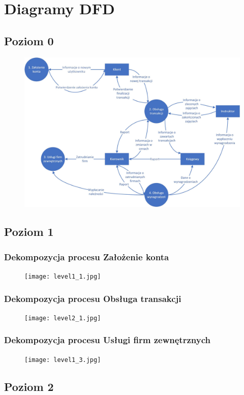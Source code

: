 \documentclass[a4paper,11pt]{article}
\begin{document}
\section{Diagramy DFD}
\subsection{Poziom 0}
    \begin{figure}[!htb]
    \centerline{\includegraphics[scale=0.9]{level0.jpg}}
    \label{fig:level0}
    \end{figure}
\newpage



\subsection{Poziom 1}
\subsubsection{Dekompozycja procesu Założenie konta}
    \begin{figure}[!htb]
    \centerline{\texttt{[image: level1\_1.jpg]}}
    \label{fig:level1_1}
    \end{figure}
    \newpage



\subsubsection{Dekompozycja procesu Obsługa transakcji}
    \begin{figure}[!htb]
    \centerline{\texttt{[image: level2\_1.jpg]}}
    \label{fig:level1_2}
    \end{figure}
    \newpage



\subsubsection{Dekompozycja procesu Usługi firm zewnętrznych}
    \begin{figure}[!htb]
    \centerline{\texttt{[image: level1\_3.jpg]}}
    \label{fig:level1_3}
    \end{figure}
    \newpage
    
    
    
    
\subsection{Poziom 2}
\newpage
 
\end{document}
